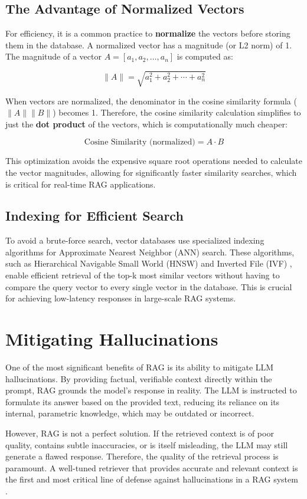\subsection{The Advantage of Normalized Vectors}
For efficiency, it is a common practice to \textbf{normalize} the vectors before storing them in the database. A normalized vector has a magnitude (or L2 norm) of 1. The magnitude of a vector \(A = [a_1, a_2, \ldots, a_n]\) is computed as:

\begin{equation}
\|A\| = \sqrt{a_1^2 + a_2^2 + \cdots + a_n^2}
\end{equation}

When vectors are normalized, the denominator in the cosine similarity formula (\(\|A\| \|B\|\)) becomes 1. Therefore, the cosine similarity calculation simplifies to just the \textbf{dot product} of the vectors, which is computationally much cheaper:

\begin{equation}
\text{Cosine Similarity (normalized)} = A \cdot B
\end{equation}

This optimization avoids the expensive square root operations needed to calculate the vector magnitudes, allowing for significantly faster similarity searches, which is critical for real-time RAG applications.


\subsection{Indexing for Efficient Search}
To avoid a brute-force search, vector databases use specialized indexing algorithms for Approximate Nearest Neighbor (ANN) search. These algorithms, such as Hierarchical Navigable Small World (HNSW) \autocite{hnsw_malkov_2018} and Inverted File (IVF) \autocite{ivf_zobel}, enable efficient retrieval of the top-k most similar vectors without having to compare the query vector to every single vector in the database. This is crucial for achieving low-latency responses in large-scale RAG systems.

\section{Mitigating Hallucinations}
One of the most significant benefits of RAG is its ability to mitigate LLM hallucinations. By providing factual, verifiable context directly within the prompt, RAG grounds the model's response in reality. The LLM is instructed to formulate its answer based on the provided text, reducing its reliance on its internal, parametric knowledge, which may be outdated or incorrect.

However, RAG is not a perfect solution. If the retrieved context is of poor quality, contains subtle inaccuracies, or is itself misleading, the LLM may still generate a flawed response. Therefore, the quality of the retrieval process is paramount. A well-tuned retriever that provides accurate and relevant context is the first and most critical line of defense against hallucinations in a RAG system \autocite{gao2024retrievalaugmented}.